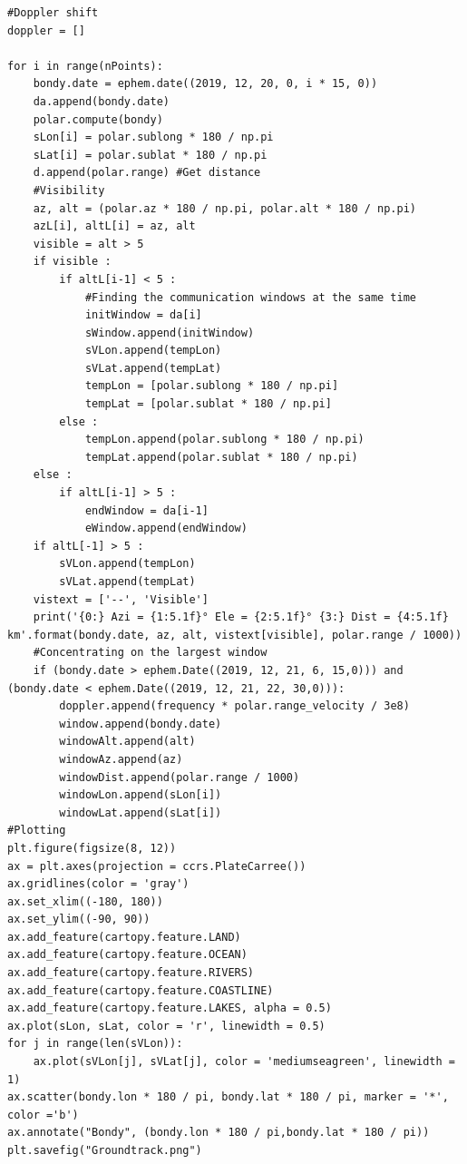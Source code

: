 \documentclass[a4paper,12pt,calibri,oneside,openany]{book}
\theoremstyle{break}
\begin{document}
\begin{verbatim}
#Doppler shift
doppler = []

for i in range(nPoints):
    bondy.date = ephem.date((2019, 12, 20, 0, i * 15, 0))
    da.append(bondy.date)
    polar.compute(bondy)
    sLon[i] = polar.sublong * 180 / np.pi
    sLat[i] = polar.sublat * 180 / np.pi
    d.append(polar.range) #Get distance
    #Visibility 
    az, alt = (polar.az * 180 / np.pi, polar.alt * 180 / np.pi)
    azL[i], altL[i] = az, alt
    visible = alt > 5
    if visible :
        if altL[i-1] < 5 :
            #Finding the communication windows at the same time
            initWindow = da[i]
            sWindow.append(initWindow)
            sVLon.append(tempLon)
            sVLat.append(tempLat)
            tempLon = [polar.sublong * 180 / np.pi]
            tempLat = [polar.sublat * 180 / np.pi]
        else :
            tempLon.append(polar.sublong * 180 / np.pi)
            tempLat.append(polar.sublat * 180 / np.pi)
    else :
        if altL[i-1] > 5 :
            endWindow = da[i-1]
            eWindow.append(endWindow)
    if altL[-1] > 5 :
        sVLon.append(tempLon)
        sVLat.append(tempLat)
    vistext = ['--', 'Visible']
    print('{0:} Azi = {1:5.1f}° Ele = {2:5.1f}° {3:} Dist = {4:5.1f} km'.format(bondy.date, az, alt, vistext[visible], polar.range / 1000))
    #Concentrating on the largest window
    if (bondy.date > ephem.Date((2019, 12, 21, 6, 15,0))) and (bondy.date < ephem.Date((2019, 12, 21, 22, 30,0))):
        doppler.append(frequency * polar.range_velocity / 3e8)
        window.append(bondy.date)
        windowAlt.append(alt)
        windowAz.append(az)
        windowDist.append(polar.range / 1000)
        windowLon.append(sLon[i])
        windowLat.append(sLat[i])
#Plotting
plt.figure(figsize(8, 12))
ax = plt.axes(projection = ccrs.PlateCarree())
ax.gridlines(color = 'gray')
ax.set_xlim((-180, 180))
ax.set_ylim((-90, 90))
ax.add_feature(cartopy.feature.LAND)
ax.add_feature(cartopy.feature.OCEAN)
ax.add_feature(cartopy.feature.RIVERS)
ax.add_feature(cartopy.feature.COASTLINE)
ax.add_feature(cartopy.feature.LAKES, alpha = 0.5)
ax.plot(sLon, sLat, color = 'r', linewidth = 0.5)
for j in range(len(sVLon)):
    ax.plot(sVLon[j], sVLat[j], color = 'mediumseagreen', linewidth = 1)
ax.scatter(bondy.lon * 180 / pi, bondy.lat * 180 / pi, marker = '*', color ='b')
ax.annotate("Bondy", (bondy.lon * 180 / pi,bondy.lat * 180 / pi))
plt.savefig("Groundtrack.png")
\end{verbatim}
\end{document}
